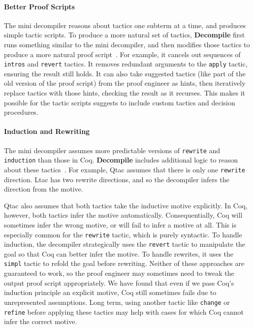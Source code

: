 \paragraph{Better Proof Scripts}
The mini decompiler reasons about tactics one subterm at a time, and produces simple tactic scripts.
To produce a more natural set of tactics, \textbf{Decompile} first runs something similar to the mini decompiler, and then modifies those tactics to produce a more natural proof script~. %
For example, it cancels out sequences of \lstinline{intros} and \lstinline{revert} tactics.
It removes redundant arguments to the \lstinline{apply} tactic, ensuring the result still holds. %
It can also take suggested tactics (like part of the old version of the proof script) from the proof engineer as hints,
then iteratively replace tactics with those hints, checking the result as it recurses.
This makes it possible for the tactic scripts \toolname suggests to include custom tactics and decision procedures.

\paragraph{Induction and Rewriting}
The mini decompiler assumes more predictable versions of \lstinline{rewrite} and \lstinline{induction}
than those in Coq. \textbf{Decompile} includes additional logic to reason about these tactics~. %
For example, Qtac assumes that there is only one \lstinline{rewrite} direction. Ltac has two rewrite directions,
and so the decompiler infers the direction from the motive.

Qtac also assumes that both tactics take the inductive motive explicitly.
In Coq, however, both tactics infer the motive automatically.
Consequentially, Coq will sometimes infer the wrong motive, %
or will fail to infer a motive at all.
This is especially common for the \lstinline{rewrite} tactic, which is purely syntactic.
To handle induction, the decompiler strategically uses the \lstinline{revert} tactic to manipulate the goal
so that Coq can better infer the motive.
To handle rewrites, it uses the \lstinline{simpl} tactic to refold the goal before rewriting.
Neither of these approaches are guaranteed to work, so the proof engineer may sometimes need to tweak the output proof script appropriately.
We have found that even if we pass Coq's induction principle an explicit motive, Coq still sometimes fails due
to unrepresented assumptions.
Long term, using another tactic like \lstinline{change} or \lstinline{refine} before applying these tactics
may help with cases for which Coq cannot infer the correct motive.

